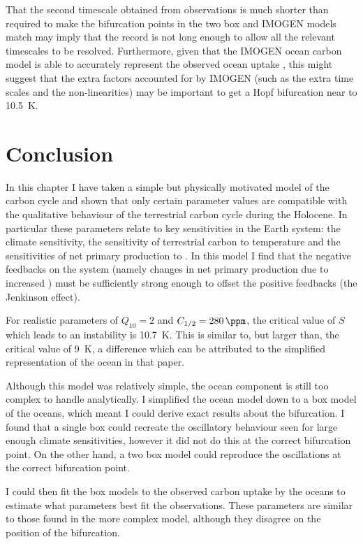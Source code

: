 That the second timescale obtained from observations is much shorter than required to make the bifurcation points in the two box and IMOGEN models match may imply that the record is not
long enough to allow all the relevant timescales to be resolved. Furthermore, given that the IMOGEN ocean carbon model is able to accurately represent the observed ocean uptake
\parencite{Joos1996}, this might suggest that the extra factors accounted for by IMOGEN (such as the extra time scales and the non-linearities) may be important to get
a Hopf bifurcation near to \SI{10.5}{\kelvin}.

\section{Conclusion}
In this chapter I have taken a simple but physically motivated model of the carbon cycle and shown that only certain parameter values are compatible with the qualitative behaviour
of the terrestrial carbon cycle during the Holocene. In particular these parameters relate to key sensitivities in the Earth system: the climate sensitivity, the sensitivity of
terrestrial carbon to temperature and the sensitivities of net primary production to . In this model I find that the negative feedbacks on the system (namely changes in net primary
production due to increased ) must be sufficiently strong enough to offset the positive feedbacks (the Jenkinson effect).

For realistic parameters of $Q_{10} = 2$ and $C_{1/2} = \SI{280}{\ppm}$, the critical value of $S$ which leads to an instability is \SI{10.7}{\kelvin}.
This is similar to, but larger than, the~\cite{Cox2006} critical value of \SI{9}{\kelvin}, a difference which can be attributed to the simplified representation of the ocean in that paper.

Although this model was relatively simple, the ocean component is still too complex to handle analytically. I simplified the ocean model down to a box model of the oceans,
which meant I could derive exact results about the bifurcation. I found that a single box could recreate the oscillatory behaviour seen for large enough climate sensitivities,
however it did not do this at the correct bifurcation point. On the other hand, a two box model could reproduce the oscillations at the correct bifurcation point.

I could then fit the box models to the observed carbon uptake by the oceans to estimate what parameters best fit the observations. These parameters are similar to those found in the more
complex model, although they disagree on the position of the bifurcation.